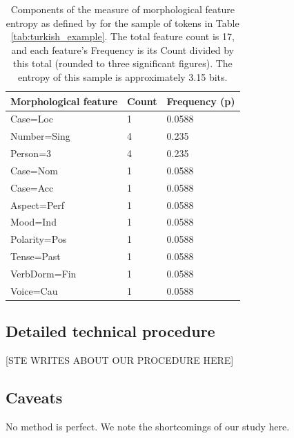 \documentclass[a4paper]{article}
\begin{document}
\begin{table}[h]
    \centering
    \caption{Components of the measure of morphological feature entropy as defined by \citet{ccoltekin2023complexity} for the sample of tokens in Table \ref{tab:turkish_example}. The total feature count is 17, and each feature's Frequency is its Count divided by this total (rounded to three significant figures). The entropy of this sample is approximately 3.15 bits.} %
    \label{tab:mfh}   
    \begin{tabular}{p{5cm}p{3cm}p{3cm}}
\toprule
	\textbf{Morphological feature}	&	\textbf{Count}	&	\textbf{Frequency (p)}	\\
    \midrule
	Case=Loc&1&0.0588       \\    \midrule
	Number=Sing&4&0.235    \\    \midrule
        Person=3&4&0.235		   \\    \midrule
	Case=Nom&1&0.0588	       \\    \midrule
	Case=Acc&1&0.0588		      \\    \midrule
        Aspect=Perf&1&0.0588      \\    \midrule
        Mood=Ind&1&0.0588		   \\    \midrule
        Polarity=Pos&1&0.0588		\\    \midrule
	Tense=Past&1&0.0588	     \\    \midrule
	VerbDorm=Fin&1&0.0588	    \\    \midrule
	Voice=Cau&1&0.0588      	\\ \bottomrule

    \end{tabular}
\end{table}


\subsection{Detailed technical procedure}

[STE WRITES ABOUT OUR PROCEDURE HERE]

\subsection{Caveats}
No method is perfect. We note the shortcomings of our study here. 
\end{document}
